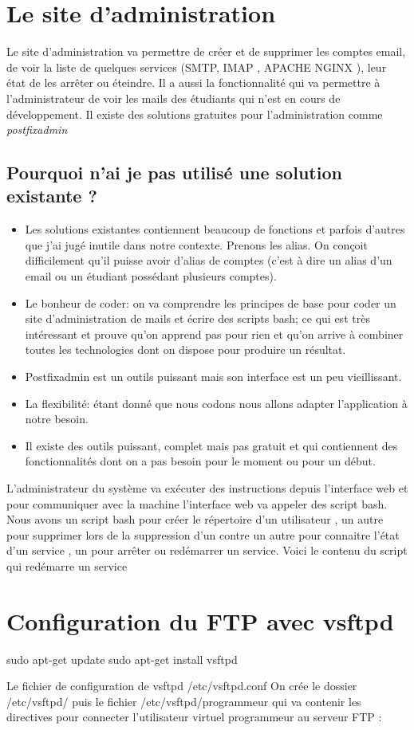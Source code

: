 \documentclass[a4paper,12pt,french]{report} %
\begin{document}
\section{Le site d'administration}
Le site d'administration va permettre de créer et de supprimer  les comptes email, de voir la liste de quelques services (SMTP, IMAP , APACHE NGINX ), leur état de les arrêter ou éteindre. Il a aussi la fonctionnalité qui va permettre à l'administrateur de voir les mails des étudiants qui n'est en cours de développement. Il existe des solutions gratuites pour l'administration comme \emph{postfixadmin}
\subsection*{Pourquoi n'ai je pas utilisé une solution existante ?}
\begin{itemize}
\item Les solutions existantes contiennent beaucoup de fonctions et parfois d'autres que j'ai jugé inutile dans notre contexte. Prenons les alias. On conçoit difficilement qu'il puisse avoir d'alias de comptes (c'est à dire un alias d'un email ou un étudiant possédant plusieurs comptes).
\item Le bonheur de coder: on va comprendre les principes de base pour coder un site d'administration de mails et écrire des scripts bash; ce qui est très intéressant et prouve qu'on apprend pas pour rien et qu'on arrive à combiner toutes les technologies dont on dispose pour produire un résultat.
\item Postfixadmin est un outils puissant mais son interface est un peu vieillissant.
\item  La flexibilité: étant donné que nous codons nous allons adapter l'application à notre besoin.
\item Il existe des outils puissant, complet mais pas gratuit et qui contiennent des fonctionnalités dont on a pas besoin pour le moment ou pour un début.
\end{itemize}
L'administrateur du système va  exécuter des instructions depuis l'interface web et pour communiquer avec la machine l'interface web va appeler des script bash. Nous avons un script bash pour créer le répertoire d'un utilisateur , un autre pour supprimer lors de la suppression d'un contre un autre pour connaitre l'état d'un service , un pour arrêter ou redémarrer un service. Voici le contenu du script qui redémarre un service 
\section{Configuration du FTP  avec vsftpd}
\begin{exempleConsole}
sudo apt-get update
sudo apt-get install vsftpd
\end{exempleConsole}
Le fichier de configuration de vsftpd /etc/vsftpd.conf
On crée le dossier /etc/vsftpd/ puis le fichier /etc/vsftpd/programmeur qui va contenir les directives pour connecter l'utilisateur virtuel programmeur au serveur FTP :
\end{document}
